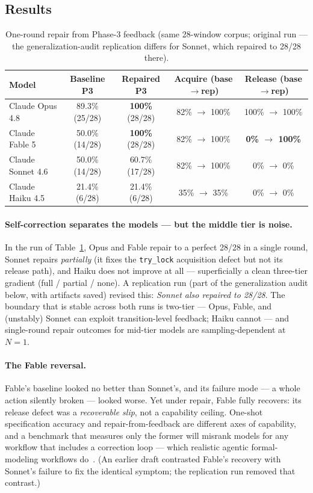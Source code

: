 \documentclass[11pt]{article}
\begin{document}
\subsection{Results}

\begin{table}[ht]
\centering
\caption{One-round repair from Phase-3 feedback (same 28-window corpus;
original run --- the generalization-audit replication differs for Sonnet,
which repaired to 28/28 there).}
\label{tab:repair}
\small
\begin{tabular}{lcccc}
\toprule
Model & Baseline P3 & Repaired P3 & Acquire (base$\to$rep) & Release (base$\to$rep) \\
\midrule
Claude Opus 4.8   & 89.3\% (25/28) & \textbf{100\%} (28/28) & 82\% $\to$ 100\% & 100\% $\to$ 100\% \\
Claude Fable 5    & 50.0\% (14/28) & \textbf{100\%} (28/28) & 82\% $\to$ 100\% & \textbf{0\% $\to$ 100\%} \\
Claude Sonnet 4.6 & 50.0\% (14/28) & 60.7\% (17/28) & 82\% $\to$ 100\% & 0\% $\to$ 0\% \\
Claude Haiku 4.5  & 21.4\% (6/28)  & 21.4\% (6/28)  & 35\% $\to$ 35\%  & 0\% $\to$ 0\% \\
\bottomrule
\end{tabular}
\end{table}

\paragraph{Self-correction separates the models --- but the middle tier is noise.}
In the run of Table~\ref{tab:repair}, Opus and Fable repair to a perfect
28/28 in a single round, Sonnet repairs \emph{partially} (it fixes the
\texttt{try\_lock} acquisition defect but not its release path), and Haiku
does not improve at all --- superficially a clean three-tier gradient
(full / partial / none). A replication run (part of the generalization
audit below, with artifacts saved) revised this: \emph{Sonnet also repaired
to 28/28}. The boundary that is stable across both runs is two-tier ---
Opus, Fable, and (unstably) Sonnet can exploit transition-level feedback;
Haiku cannot --- and single-round repair outcomes for mid-tier models are
sampling-dependent at $N{=}1$.

\paragraph{The Fable reversal.}
Fable's baseline looked no better than Sonnet's, and its failure mode ---
a whole action silently broken --- looked worse. Yet under repair, Fable
fully recovers: its release defect was a \emph{recoverable slip}, not a
capability ceiling. One-shot specification accuracy and
repair-from-feedback are different axes of capability, and a benchmark that
measures only the former will misrank models for any workflow that includes
a correction loop --- which realistic agentic formal-modeling workflows
do~\cite{sigops2026}. (An earlier draft contrasted Fable's recovery with
Sonnet's failure to fix the identical symptom; the replication run removed
that contrast.)
\end{document}
